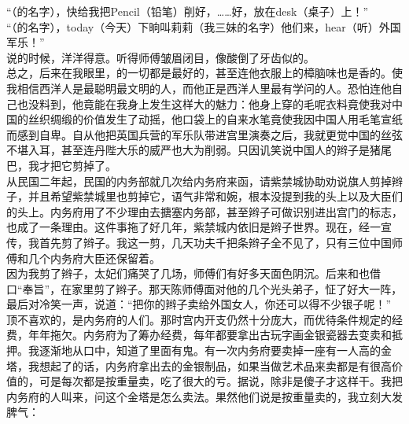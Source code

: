 “（的名字），快给我把Pencil（铅笔）削好，……好，放在desk（桌子）上！”\\

“（的名字），today（今天）下晌叫莉莉（我三妹的名字）他们来，hear（听）外国军乐！”\\

说的时候，洋洋得意。听得师傅皱眉闭目，像酸倒了牙齿似的。\\

总之，后来在我眼里，的一切都是最好的，甚至连他衣服上的樟脑味也是香的。使我相信西洋人是最聪明最文明的人，而他正是西洋人里最有学问的人。恐怕连他自己也没料到，他竟能在我身上发生这样大的魅力：他身上穿的毛呢衣料竟使我对中国的丝织绸缎的价值发生了动摇，他口袋上的自来水笔竟使我因中国人用毛笔宣纸而感到自卑。自从他把英国兵营的军乐队带进宫里演奏之后，我就更觉中国的丝弦不堪入耳，甚至连丹陛大乐的威严也大为削弱。只因讥笑说中国人的辫子是猪尾巴，我才把它剪掉了。\\

从民国二年起，民国的内务部就几次给内务府来函，请紫禁城协助劝说旗人剪掉辫子，并且希望紫禁城里也剪掉它，语气非常和婉，根本没提到我的头上以及大臣们的头上。内务府用了不少理由去搪塞内务部，甚至辫子可做识别进出宫门的标志，也成了一条理由。这件事拖了好几年，紫禁城内依旧是辫子世界。现在，经一宣传，我首先剪了辫子。我这一剪，几天功夫千把条辫子全不见了，只有三位中国师傅和几个内务府大臣还保留着。\\

因为我剪了辫子，太妃们痛哭了几场，师傅们有好多天面色阴沉。后来和也借口“奉旨”，在家里剪了辫子。那天陈师傅面对他的几个光头弟子，怔了好大一阵，最后对冷笑一声，说道：“把你的辫子卖给外国女人，你还可以得不少银子呢！”\\

顶不喜欢的，是内务府的人们。那时宫内开支仍然十分庞大，而优待条件规定的经费，年年拖欠。内务府为了筹办经费，每年都要拿出古玩字画金银瓷器去变卖和抵押。我逐渐地从口中，知道了里面有鬼。有一次内务府要卖掉一座有一人高的金塔，我想起了的话，内务府拿出去的金银制品，如果当做艺术品来卖都是有很高价值的，可是每次都是按重量卖，吃了很大的亏。据说，除非是傻子才这样干。我把内务府的人叫来，问这个金塔是怎么卖法。果然他们说是按重量卖的，我立刻大发脾气：\\

